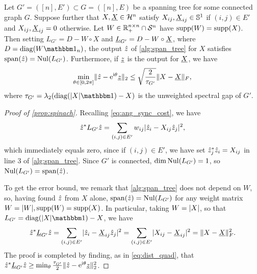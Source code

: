 \begin{proposition} \label{prop:spinach}
  Let $G' = ([n], E') \subset G = ([n], E)$ be a spanning tree for some connected graph $G$.  Suppose further that $X, \underline{X} \in \mathcal{H}^n$ satisfy $X_{ij}, \underline{X}_{ij} \in \mathbb{S}^1$ if $(i, j) \in E'$ and $X_{ij}, \underline{X}_{ij} = 0$ otherwise.  Let $W \in \mathbb{R}_+^{n \times n} \cap \mathcal{S}^n$ have $\operatorname{supp}(W) = \operatorname{supp}(X)$.  Then setting $L_{G'} = D - W \circ X$ and $\underline{L}_{G'} = D - W \circ \underline{X}$, where $D = \diag(W \one_n)$, the output $\hat{z}$ of \cref{alg:span_tree} for $X$ satisfies $\operatorname{span}(\hat{z}) = \operatorname{Nul}(L_{G'})$.  Furthermore, if $\underline{z}$ is the output for $\underline{X}$, we have \begin{equation} \min_{\theta \in [0, 2\pi]} \lVert\hat{z} - \mathrm{e}^{\mathrm{i} \theta} \underline{z}\rVert_2 \le \sqrt{\dfrac{2}{\tau_{G'}}} \lVert X - \underline{X}\rVert_F, \label{eq:spinach_bnd} \end{equation} where $\tau_{G'} = \lambda_2(\diag(\abs{X} \one) - X)$ is the unweighted spectral gap of $G'$.
\end{proposition}

\begin{proof}[Proof of \cref{prop:spinach}]
  Recalling \eqref{eq:ang_sync_cost}, we have \[\hat{z}^* L_{G'} \hat{z} = \sum_{(i, j) \in E'} w_{ij} \lvert\hat{z}_i - X_{ij} \hat{z}_j\rvert^2,\] which immediately equals zero, since if $(i, j) \in E'$, we have set $\hat{z}_j^* \hat{z}_i = X_{ij}$ in line 3 of \cref{alg:span_tree}.  Since $G'$ is connected, $\dim \operatorname{Nul}(L_{G'}) = 1$, so $\operatorname{Nul}(L_{G'}) = \operatorname{span}(\hat{z})$.

  To get the error bound, we remark that \cref{alg:span_tree} does not depend on $W$, so, having found $\hat{z}$ from $X$ alone, $\operatorname{span}(\hat{z}) = \operatorname{Nul}(L_{G'})$ for any weight matrix $W = \lvert W\rvert, \operatorname{supp}(W) = \operatorname{supp}(X)$.  In particular, taking $W = \lvert X\rvert$, so that $L_{G'} = \diag(\abs{X} \one) - X$, we have \[\hat{z}^* \underline{L}_{G'} \hat{z} = \sum_{(i, j) \in E'} \lvert\hat{z}_i - \underline{X}_{ij} \hat{z}_j\rvert^2 = \sum_{(i, j) \in E'} \lvert X_{ij} - \underline{X}_{ij}\rvert^2 = \lVert X - \underline{X}\rVert_F^2.\]  The proof is completed by finding, as in \eqref{eq:dist_quad}, that $\hat{z}^* \underline{L}_{G'} \hat{z} \ge \min_\theta \frac{\tau_{G'}}{2} \lVert\hat{z} - \mathrm{e}^{\mathrm{i} \theta} \underline{z}\rVert_2^2$.
\end{proof}

